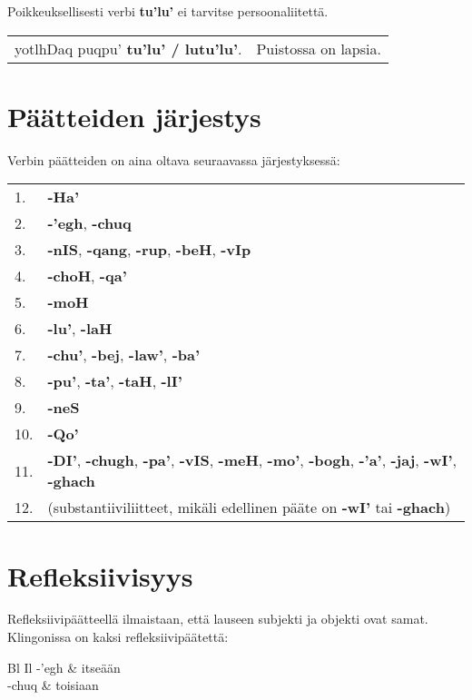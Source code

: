 \documentclass{book}
\begin{document}
Poikkeuksellisesti verbi \textbf{tu'lu'} ei tarvitse persoonaliitettä.

\begin{tabular}{l l}
    yotlhDaq puqpu' \textbf{tu'lu' / lutu'lu'}. & Puistossa on lapsia. \\
\end{tabular}

\section{Päätteiden järjestys}

Verbin päätteiden on aina oltava seuraavassa järjestyksessä:

\begin{tabular}{l l}
    1. & \textbf{-Ha'} \\
    2. & \textbf{-'egh}, \textbf{-chuq} \\
    3. & \textbf{-nIS}, \textbf{-qang}, \textbf{-rup}, \textbf{-beH}, \textbf{-vIp} \\
    4. & \textbf{-choH}, \textbf{-qa'} \\
    5. & \textbf{-moH} \\
    6. & \textbf{-lu'}, \textbf{-laH} \\
    7. & \textbf{-chu'}, \textbf{-bej}, \textbf{-law'}, \textbf{-ba'} \\
    8. & \textbf{-pu'}, \textbf{-ta'}, \textbf{-taH}, \textbf{-lI'} \\
    9. & \textbf{-neS} \\
    10. & \textbf{-Qo'} \\
    11. & \textbf{-DI'}, \textbf{-chugh}, \textbf{-pa'}, \textbf{-vIS}, \textbf{-meH}, \textbf{-mo'}, \textbf{-bogh}, \textbf{-'a'}, \textbf{-jaj}, \textbf{-wI'}, \textbf{-ghach} \\
    12. & (substantiiviliitteet, mikäli edellinen pääte on \textbf{-wI'} tai \textbf{-ghach}) \\
\end{tabular}

\section{Refleksiivisyys}

Refleksiivipäätteellä ilmaistaan, että lauseen subjekti ja objekti ovat samat.
Klingonissa on kaksi refleksiivipäätettä:

\begin{tabular}{Bl Il}
    -'egh & itseään \\
    -chuq & toisiaan \\
\end{tabular}
\end{document}

